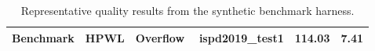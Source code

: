 \begin{table}[t]
\centering
\caption{Representative quality results from the synthetic benchmark harness.}
\label{tab:quality}
\begin{tabular}{lrr}
\toprule
Benchmark & HPWL & Overflow \
\midrule
ispd2019_test1 & 114.03 & 7.41 \\
\bottomrule
\end{tabular}
\end{table}
